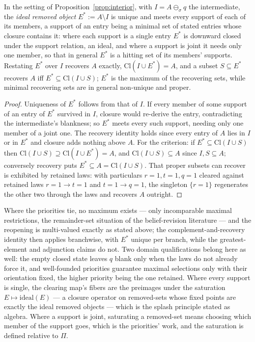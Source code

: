 \begin{proposition}\label{prop:recovery}
In the setting of Proposition~\ref{prop:interior}, with $I = A \ominus_{\sigma} q$ the intermediate, the \emph{ideal removed object} $E^{*} := A \setminus I$ is unique and meets every support of each of its members, a support of an entry being a minimal set of stated entries whose closure contains it: where each support is a single entry $E^{*}$ is downward closed under the support relation, an ideal, and where a support is joint it needs only one member, so that in general $E^{*}$ is a hitting set of its members' supports. Restating $E^{*}$ over $I$ recovers $A$ exactly, $\mathrm{Cl}(I \cup E^{*}) = A$, and a subset $S \subseteq E^{*}$ recovers $A$ iff $E^{*} \subseteq \mathrm{Cl}(I \cup S)$; $E^{*}$ is the maximum of the recovering sets, while minimal recovering sets are in general non-unique and proper.
\end{proposition}
\begin{proof}
Uniqueness of $E^{*}$ follows from that of $I$. If every member of some support of an entry of $E^{*}$ survived in $I$, closure would re-derive the entry, contradicting the intermediate's blankness; so $E^{*}$ meets every such support, needing only one member of a joint one. The recovery identity holds since every entry of $A$ lies in $I$ or in $E^{*}$ and closure adds nothing above $A$. For the criterion: if $E^{*} \subseteq \mathrm{Cl}(I \cup S)$ then $\mathrm{Cl}(I \cup S) \supseteq \mathrm{Cl}(I \cup E^{*}) = A$, and $\mathrm{Cl}(I \cup S) \subseteq A$ since $I, S \subseteq A$; conversely recovery puts $E^{*} \subseteq A = \mathrm{Cl}(I \cup S)$. That proper subsets can recover is exhibited by retained laws: with particulars $r{=}1, t{=}1, q{=}1$ cleared against retained laws $r{=}1 \rightarrow t{=}1$ and $t{=}1 \rightarrow q{=}1$, the singleton $\{r{=}1\}$ regenerates the other two through the laws and recovers $A$ outright.
\end{proof}
\noindent Where the priorities tie, no maximum exists --- only incomparable maximal restrictions, the remainder-set situation of the belief-revision literature \parencite{agm1985} --- and the reopening is multi-valued exactly as stated above; the complement-and-recovery identity then applies branchwise, with $E^{*}$ unique per branch, while the greatest-element and adjunction claims do not. Two domain qualifications belong here as well: the empty closed state leaves $q$ blank only when the laws do not already force it, and well-founded priorities guarantee maximal selections only with their orientation fixed, the higher priority being the one retained.
\noindent Where every support is single, the clearing map's fibers are the preimages under the saturation $E \mapsto \mathrm{ideal}(E)$ --- a closure operator on removed-sets whose fixed points are exactly the ideal removed objects --- which is the splash principle stated as algebra. Where a support is joint, saturating a removed-set means choosing which member of the support goes, which is the priorities' work, and the saturation is defined relative to $\Pi$. 

\printbibliography

